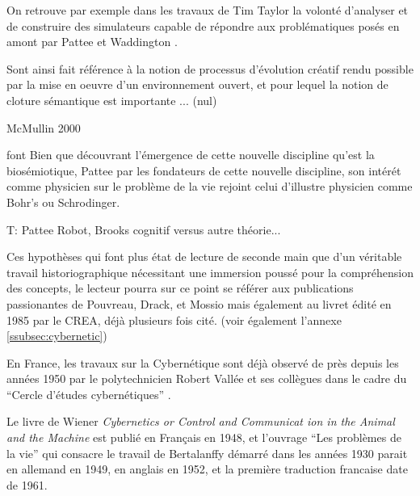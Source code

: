 On retrouve par exemple dans les travaux de Tim Taylor la volonté d'analyser et de construire des simulateurs capable de répondre aux  problématiques posés en amont par Pattee et Waddington \autocite{Taylor1999}. 

Sont ainsi fait référence à la notion de processus d'évolution créatif rendu possible par la mise en oeuvre d'un environnement ouvert, et pour lequel la notion de cloture sémantique est importante ... (nul)

McMullin 2000

 font Bien que découvrant l'émergence de cette nouvelle discipline qu'est la biosémiotique, Pattee par les fondateurs de cette nouvelle discipline, son intérét comme physicien sur le problème de la vie rejoint celui d'illustre physicien comme Bohr's ou Schrodinger. 

T: Pattee Robot, Brooks cognitif versus autre théorie...




Ces hypothèses qui font plus état de lecture de seconde main que d'un véritable travail historiographique nécessitant une immersion poussé pour la compréhension des concepts, le lecteur pourra sur ce point se référer aux publications passionantes de Pouvreau, Drack, et Mossio \autocites{Pouvreau2006, Pouvreau2013, Drack2015} mais également au livret édité en 1985 par le CREA, déjà plusieurs fois cité. (voir également l'annexe \ref{ssubsec:cybernetic})





En France, les travaux sur la Cybernétique sont déjà observé de près depuis les années 1950 par le polytechnicien Robert Vallée et ses collègues dans le cadre du \enquote{Cercle d’études cybernétiques} \autocite{Bricage1990}. 

Le livre de Wiener \textit{Cybernetics or Control and Communicat
ion in the Animal and the Machine} est publié en Français en 1948, et l'ouvrage \enquote{Les problèmes de la vie}  qui consacre le travail de Bertalanffy démarré dans les années 1930 parait en allemand en 1949, en anglais en 1952, et la première traduction francaise date de 1961. \autocite{Vallee2005}

